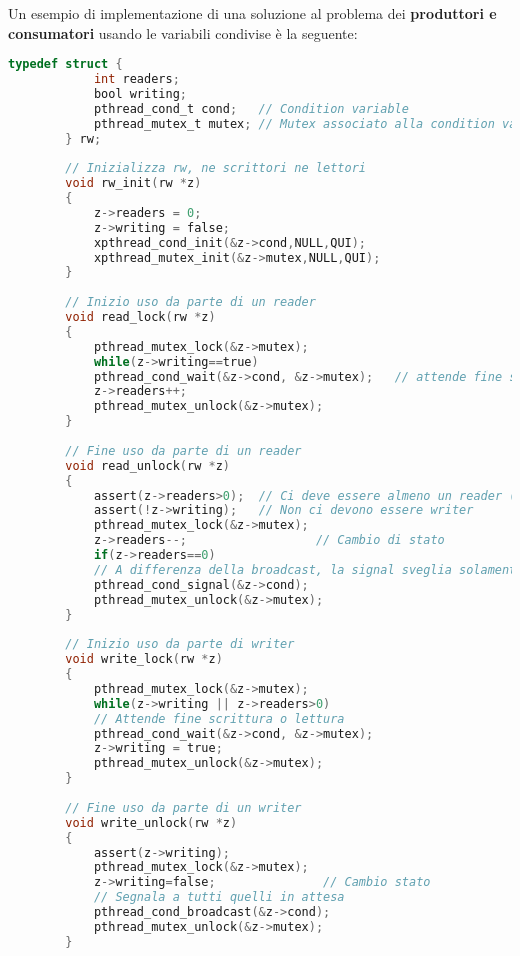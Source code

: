 \begin{example}
	Un esempio di implementazione di una soluzione al problema dei \textbf{produttori e consumatori} usando le variabili condivise è la seguente:
	\begin{lstlisting}[language=C]
		typedef struct {
			int readers;
			bool writing;
			pthread_cond_t cond;   // Condition variable
			pthread_mutex_t mutex; // Mutex associato alla condition variable
		} rw;
		
		// Inizializza rw, ne scrittori ne lettori 
		void rw_init(rw *z)
		{
			z->readers = 0;
			z->writing = false;
			xpthread_cond_init(&z->cond,NULL,QUI);
			xpthread_mutex_init(&z->mutex,NULL,QUI);
		}
		
		// Inizio uso da parte di un reader
		void read_lock(rw *z)
		{
			pthread_mutex_lock(&z->mutex);
			while(z->writing==true)
			pthread_cond_wait(&z->cond, &z->mutex);   // attende fine scrittura
			z->readers++;
			pthread_mutex_unlock(&z->mutex);
		}
		
		// Fine uso da parte di un reader
		void read_unlock(rw *z)
		{
			assert(z->readers>0);  // Ci deve essere almeno un reader (me stesso)
			assert(!z->writing);   // Non ci devono essere writer 
			pthread_mutex_lock(&z->mutex);
			z->readers--;                  // Cambio di stato       
			if(z->readers==0) 
			// A differenza della broadcast, la signal sveglia solamente uno dei thread in attesa
			pthread_cond_signal(&z->cond); 
			pthread_mutex_unlock(&z->mutex);
		}
		
		// Inizio uso da parte di writer  
		void write_lock(rw *z)
		{
			pthread_mutex_lock(&z->mutex);
			while(z->writing || z->readers>0)
			// Attende fine scrittura o lettura
			pthread_cond_wait(&z->cond, &z->mutex);   
			z->writing = true;
			pthread_mutex_unlock(&z->mutex);
		}
		
		// Fine uso da parte di un writer
		void write_unlock(rw *z)
		{
			assert(z->writing);
			pthread_mutex_lock(&z->mutex);
			z->writing=false;               // Cambio stato
			// Segnala a tutti quelli in attesa 
			pthread_cond_broadcast(&z->cond);  
			pthread_mutex_unlock(&z->mutex);
		}
	\end{lstlisting}
\end{example}